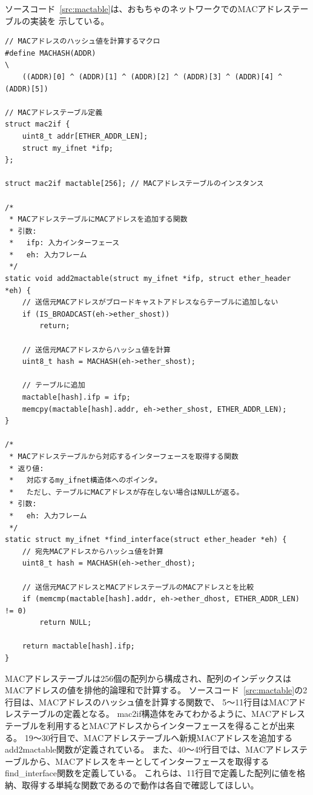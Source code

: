 ソースコード~\ref{src:mactable}は、おもちゃのネットワークでのMACアドレステーブルの実装を
示している。
\begin{lstlisting}[caption=MACアドレステーブルの実装,label=src:mactable]
// MACアドレスのハッシュ値を計算するマクロ
#define MACHASH(ADDR)                                                          \
    ((ADDR)[0] ^ (ADDR)[1] ^ (ADDR)[2] ^ (ADDR)[3] ^ (ADDR)[4] ^ (ADDR)[5])

// MACアドレステーブル定義
struct mac2if {
    uint8_t addr[ETHER_ADDR_LEN];
    struct my_ifnet *ifp;
};

struct mac2if mactable[256]; // MACアドレステーブルのインスタンス

/*
 * MACアドレステーブルにMACアドレスを追加する関数
 * 引数:
 *   ifp: 入力インターフェース
 *   eh: 入力フレーム
 */
static void add2mactable(struct my_ifnet *ifp, struct ether_header *eh) {
    // 送信元MACアドレスがブロードキャストアドレスならテーブルに追加しない
    if (IS_BROADCAST(eh->ether_shost))
        return;

    // 送信元MACアドレスからハッシュ値を計算
    uint8_t hash = MACHASH(eh->ether_shost);

    // テーブルに追加
    mactable[hash].ifp = ifp;
    memcpy(mactable[hash].addr, eh->ether_shost, ETHER_ADDR_LEN);
}

/*
 * MACアドレステーブルから対応するインターフェースを取得する関数
 * 返り値:
 *   対応するmy_ifnet構造体へのポインタ。
 *   ただし、テーブルにMACアドレスが存在しない場合はNULLが返る。
 * 引数:
 *   eh: 入力フレーム
 */
static struct my_ifnet *find_interface(struct ether_header *eh) {
    // 宛先MACアドレスからハッシュ値を計算
    uint8_t hash = MACHASH(eh->ether_dhost);

    // 送信元MACアドレスとMACアドレステーブルのMACアドレスとを比較
    if (memcmp(mactable[hash].addr, eh->ether_dhost, ETHER_ADDR_LEN) != 0)
        return NULL;

    return mactable[hash].ifp;
}
\end{lstlisting}
MACアドレステーブルは256個の配列から構成され、配列のインデックスはMACアドレスの値を排他的論理和で計算する。
ソースコード~\ref{src:mactable}の2行目は、MACアドレスのハッシュ値を計算する関数で、
5〜11行目はMACアドレステーブルの定義となる。
mac2if構造体をみてわかるように、MACアドレステーブルを利用するとMACアドレスからインターフェースを得ることが出来る。
19〜30行目で、MACアドレステーブルへ新規MACアドレスを追加するadd2mactable関数が定義されている。
また、40〜49行目では、MACアドレステーブルから、MACアドレスをキーとしてインターフェースを取得する
find\_interface関数を定義している。
これらは、11行目で定義した配列に値を格納、取得する単純な関数であるので動作は各自で確認してほしい。

